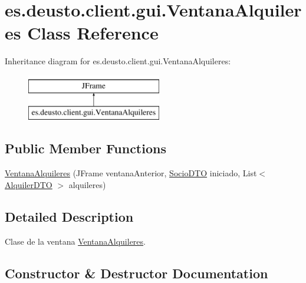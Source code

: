 \hypertarget{classes_1_1deusto_1_1client_1_1gui_1_1_ventana_alquileres}{}\section{es.\+deusto.\+client.\+gui.\+Ventana\+Alquileres Class Reference}
\label{classes_1_1deusto_1_1client_1_1gui_1_1_ventana_alquileres}
Inheritance diagram for es.\+deusto.\+client.\+gui.\+Ventana\+Alquileres\+:\begin{figure}[H]
\begin{center}
\leavevmode
\includegraphics[height=2.000000cm]{classes_1_1deusto_1_1client_1_1gui_1_1_ventana_alquileres}
\end{center}
\end{figure}
\subsection*{Public Member Functions}
\begin{DoxyCompactItemize}
\item 
\mbox{\hyperlink{classes_1_1deusto_1_1client_1_1gui_1_1_ventana_alquileres_adbcef892435e73ca5a3eb83422944ff1}{Ventana\+Alquileres}} (J\+Frame ventana\+Anterior, \mbox{\hyperlink{classes_1_1deusto_1_1server_1_1dto_1_1_socio_d_t_o}{Socio\+D\+TO}} iniciado, List$<$ \mbox{\hyperlink{classes_1_1deusto_1_1server_1_1dto_1_1_alquiler_d_t_o}{Alquiler\+D\+TO}} $>$ alquileres)
\end{DoxyCompactItemize}


\subsection{Detailed Description}
Clase de la ventana \mbox{\hyperlink{classes_1_1deusto_1_1client_1_1gui_1_1_ventana_alquileres}{Ventana\+Alquileres}}. 

\subsection{Constructor \& Destructor Documentation}
\mbox{\label{classes_1_1deusto_1_1client_1_1gui_1_1_ventana_alquileres_adbcef892435e73ca5a3eb83422944ff1}} 
